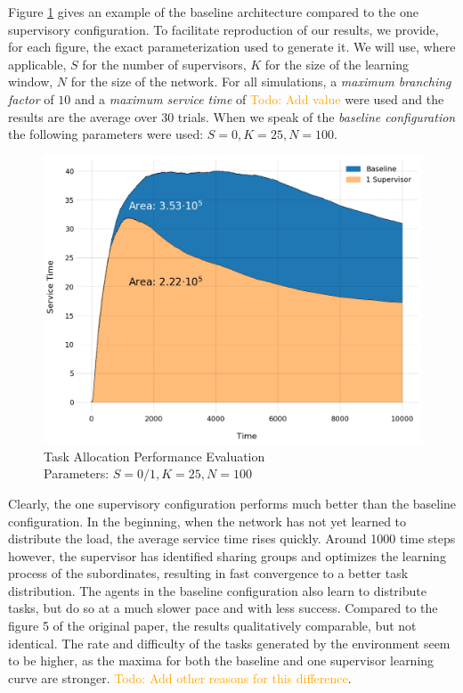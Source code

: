 \documentclass[letterpaper]{article}
\newcommand\todo[1]{\textcolor{orange}{Todo: #1}}
\begin{document}
Figure \ref{fig:areas} gives an example of the baseline architecture compared to the one supervisory configuration. To facilitate reproduction of our results, we provide, for each figure, the exact parameterization used to generate it. We will use, where applicable, $S$ for the number of supervisors, $K$ for the size of the learning window, $N$ for the size of the network. For all simulations, a \textit{maximum branching factor} of $10$ and a \textit{maximum service time} of \todo{Add value} were used and the results are the average over 30 trials. When we speak of the \textit{baseline configuration} the following parameters were used: $S=0,K=25,N=100$.
\begin{figure}[ht]
 \begin{center}
  \includegraphics[width=\linewidth]{figures/figure5_light}
  \caption{Task Allocation Performance Evaluation\\Parameters: $S=0/1,K=25,N=100$}
  \label{fig:areas}
 \end{center}
\end{figure}

Clearly, the one supervisory configuration performs much better than the baseline configuration. In the beginning, when the network has not yet learned to distribute the load, the average service time rises quickly. Around 1000 time steps however, the supervisor has identified sharing groups and optimizes the learning process of the subordinates, resulting in fast convergence to a better task distribution. The agents in the baseline configuration also learn to distribute tasks, but do so at a much slower pace and with less success. Compared to the figure 5 of the original paper, the results qualitatively comparable, but not identical. The rate and difficulty of the tasks generated by the environment seem to be higher, as the maxima for both the baseline and one supervisor learning curve are stronger. \todo{Add other reasons for this difference}.
\end{document}
